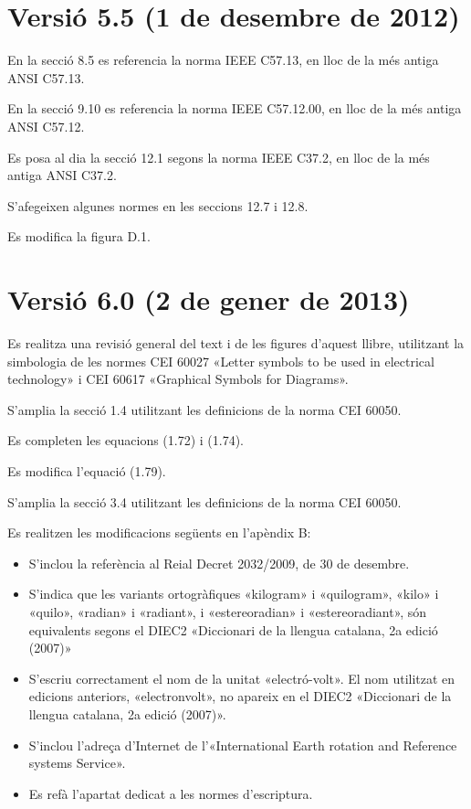 \section*{Versió 5.5 (1 de desembre de 2012)}

En la secció 8.5 es referencia la norma  IEEE C57.13, en lloc de la més antiga ANSI C57.13.

En la secció 9.10 es referencia la norma  IEEE C57.12.00, en lloc de la més antiga ANSI C57.12.

Es posa al dia la secció 12.1 segons la norma IEEE C37.2, en lloc de la més antiga ANSI C37.2.

S'afegeixen algunes normes en les seccions 12.7 i 12.8.

Es modifica  la figura D.1.


\section*{Versió 6.0 (2 de gener de 2013)}

Es realitza una revisió general del text i de les figures d'aquest  llibre, utilitzant la simbologia de les normes CEI 60027  «Letter symbols to be used in electrical technology» i  CEI 60617  «Graphical Symbols for Diagrams».

S'amplia la secció 1.4 utilitzant les definicions de la norma CEI 60050.

Es completen les equacions (1.72) i (1.74).

Es modifica l'equació (1.79).

S'amplia la secció  3.4 utilitzant les definicions de la norma CEI 60050.

Es realitzen les modificacions següents en l'apèndix B:
\begin{itemize}
   \item  S'inclou la referència al Reial Decret 2032/2009, de 30 de desembre.
   \item S'indica que les variants ortogràfiques  «kilogram»
    i «quilogram», «kilo» i «quilo», «radian» i «radiant», i
   «estereoradian» i «estereoradiant», són equivalents segons el DIEC2 «Diccionari de la llengua catalana, 2a edició (2007)»
    \item S'escriu correctament el nom de la unitat «electró-volt». El nom  utilitzat en edicions anteriors,   «electronvolt», no apareix en el DIEC2 «Diccionari de la llengua catalana, 2a edició (2007)».
    \item S'inclou l'adreça d'Internet de l'«International Earth rotation and Reference systems Service».
     \item Es refà l'apartat dedicat a les normes d'escriptura.
\end{itemize}

